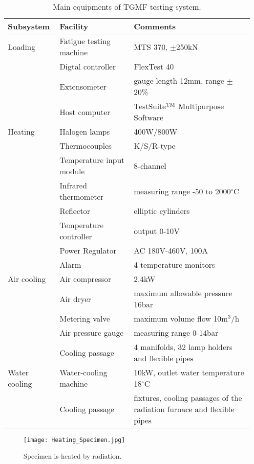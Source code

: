 \begin{table}[htbp]
  \centering
  \caption{Main equipments of TGMF testing system.}
    \begin{tabular}{p{3cm}p{4.5cm}p{6.5cm}}
    \toprule
    Subsystem & Facility & Comments \\
    \midrule
    Loading  & Fatigue testing machine & MTS 370, $\pm$250kN \\
          & Digtal controller & FlexTest 40 \\
          & Extensometer & gauge length 12mm, range $\pm$20\% \\
          & Host computer &  TestSuite$^{\rm TM}$ Multipurpose Software\\
    \midrule
    Heating & Halogen lamps & 400W/800W \\
          & Thermocouples & K/S/R-type \\
          & Temperature input module & 8-channel \\
          & Infrared thermometer & measuring range -50 to 2000$^\circ$C \\
          & Reflector & elliptic cylinders \\
          & Temperature controller & output 0-10V \\
          & Power Regulator & AC 180V-460V, 100A \\
          & Alarm & 4 temperature monitors \\
    \midrule
    Air cooling & Air compressor & 2.4kW \\
          & Air dryer & maximum allowable pressure 16bar \\
          & Metering valve & maximum volume flow 10m$^3$/h \\
          & Air pressure gauge & measuring range 0-14bar \\
          & Cooling passage & 4 manifolds, 32 lamp holders and flexible pipes \\
    \midrule
    Water cooling & Water-cooling machine & 10kW, outlet water temperature 18$^\circ$C \\
          & Cooling passage & fixtures, cooling passages of the radiation furnace and flexible pipes \\
    \bottomrule
    \end{tabular}%
  \label{Tab:TGMF_subsystem}%
\end{table}%

\begin{figure}[!htp]
	\centering
	\texttt{[image: Heating\_Specimen.jpg]}
	\caption{Specimen is heated by radiation.}
	\label{Fig:Heating_Specimen}
\end{figure}

